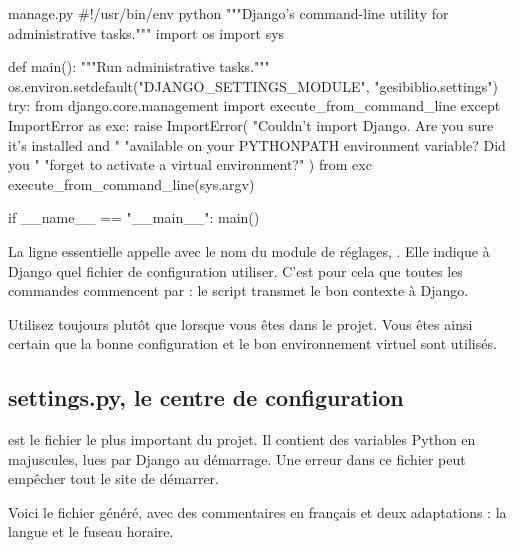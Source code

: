 \begin{codebox}[python]{manage.py}
#!/usr/bin/env python
"""Django's command-line utility for administrative tasks."""
import os
import sys


def main():
    """Run administrative tasks."""
    os.environ.setdefault("DJANGO_SETTINGS_MODULE", "gesibiblio.settings")
    try:
        from django.core.management import execute_from_command_line
    except ImportError as exc:
        raise ImportError(
            "Couldn't import Django. Are you sure it's installed and "
            "available on your PYTHONPATH environment variable? Did you "
            "forget to activate a virtual environment?"
        ) from exc
    execute_from_command_line(sys.argv)


if __name__ == "__main__":
    main()
\end{codebox}

La ligne essentielle appelle  avec le nom du module
de réglages, . Elle indique à Django quel fichier de
configuration utiliser. C'est pour cela que toutes les commandes commencent par
 : le script transmet le bon contexte à Django.

\begin{bonne}
Utilisez toujours  plutôt que  lorsque
vous êtes dans le projet. Vous êtes ainsi certain que la bonne configuration et le
bon environnement virtuel sont utilisés.
\end{bonne}

\subsection{settings.py, le centre de configuration}

 est le fichier le plus important du projet. Il contient des
variables Python en majuscules, lues par Django au démarrage. Une erreur dans ce
fichier peut empêcher tout le site de démarrer.

Voici le fichier généré, avec des commentaires en français et deux adaptations :
la langue et le fuseau horaire.


